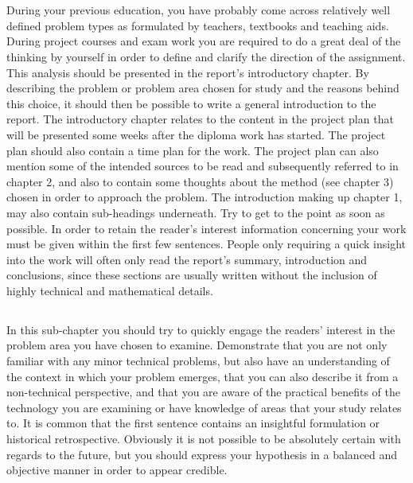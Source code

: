 \section{}\label{sec:intro}
During your previous education, you have probably come across relatively well
defined problem types as formulated by teachers, textbooks and teaching aids.
During project courses and exam work you are required to do a great deal of the
thinking by yourself in order to define and clarify the direction of the
assignment. This analysis should be presented in the report's introductory
chapter. By describing the problem or problem area chosen for study and the
reasons behind this choice, it should then be possible to write a general
introduction to the report. The introductory chapter relates to the content in
the project plan that will be presented some weeks after the diploma work has
started. The project plan should also contain a time plan for the work. The
project plan can also mention some of the intended sources to be read and
subsequently referred to in chapter 2, and also to contain some thoughts about
the method (see chapter 3) chosen in order to approach the problem. The
introduction making up chapter 1, may also contain sub-headings underneath. Try
to get to the point as soon as possible. In order to retain the reader’s
interest information concerning your work must be given within the first few
sentences. People only requiring a quick insight into the work will often only
read the report's summary, introduction and conclusions, since these sections
are usually written without the inclusion of highly technical and mathematical
details.

\subsection{}\label{subsec:background}
\noindent 
In this sub-chapter you should try to quickly engage the readers' interest in
the problem area you have chosen to examine. Demonstrate that you are not only
familiar with any minor technical problems, but also have an understanding of
the context in which your problem emerges, that you can also describe it from a
non-technical perspective, and that you are aware of the practical benefits of
the technology you are examining or have knowledge of areas that your study
relates to. It is common that the first sentence contains an insightful
formulation or historical retrospective. Obviously it is not possible to be
absolutely certain with regards to the future, but you should express your
hypothesis in a balanced and objective manner in order to appear credible.

